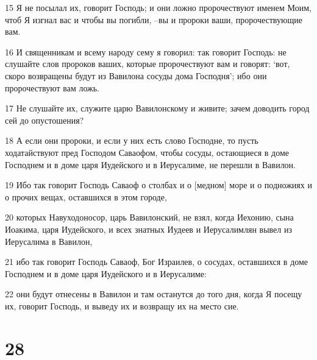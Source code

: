 \par 15 Я не посылал их, говорит Господь; и они ложно пророчествуют именем Моим, чтоб Я изгнал вас и чтобы вы погибли, --вы и пророки ваши, пророчествующие вам.
\par 16 И священникам и всему народу сему я говорил: так говорит Господь: не слушайте слов пророков ваших, которые пророчествуют вам и говорят: `вот, скоро возвращены будут из Вавилона сосуды дома Господня'; ибо они пророчествуют вам ложь.
\par 17 Не слушайте их, служите царю Вавилонскому и живите; зачем доводить город сей до опустошения?
\par 18 А если они пророки, и если у них есть слово Господне, то пусть ходатайствуют пред Господом Саваофом, чтобы сосуды, остающиеся в доме Господнем и в доме царя Иудейского и в Иерусалиме, не перешли в Вавилон.
\par 19 Ибо так говорит Господь Саваоф о столбах и о [медном] море и о подножиях и о прочих вещах, оставшихся в этом городе,
\par 20 которых Навуходоносор, царь Вавилонский, не взял, когда Иехонию, сына Иоакима, царя Иудейского, и всех знатных Иудеев и Иерусалимлян вывел из Иерусалима в Вавилон,
\par 21 ибо так говорит Господь Саваоф, Бог Израилев, о сосудах, оставшихся в доме Господнем и в доме царя Иудейского и в Иерусалиме:
\par 22 они будут отнесены в Вавилон и там останутся до того дня, когда Я посещу их, говорит Господь, и выведу их и возвращу их на место сие.

\chapter{28}

